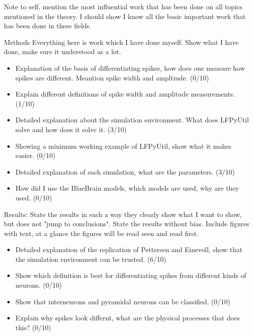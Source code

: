 \documentclass[altfont, fleqn]{uiophd}
\begin{document}
\noindent 
Note to self, mention the most influential work that has been done on all
topics mentioned in the theory. I should show I know all the basic 
important work that has been done in these fields. 
\newline

Methods
\newline
Everything here is work which I have done myself. Show what I have done, make sure
it understood as a lot.
\begin{itemize}
    \item Explanation of the basis of differentiating spikes, how does
        one measure how spikes are different. Meantion spike width and 
        ampltiude. (0/10)
    \item Explain different definitions of spike width and amplitude measurements. (1/10)
    \item Detailed explanation about the simulation environment. 
        What does LFPyUtil solve and how does it solve it. (3/10)
    \item Showing a minimum working example of LFPyUtil, show what it makes easier. (0/10)
    \item Detailed explanation of each simulation, what are the parameters. (3/10)
    \item How did I use the BlueBrain models, which models are used, why are they used. (0/10)
\end{itemize}

Results:
\newline
State the results in such a way they clearly show what I want to show, but
does not "jump to conclusions". State the results without bias.
Include figures with text, at a glance the figures will be read seen and read
first. 
\begin{itemize}
    \item Detailed explanation of the replication of Pettersen and Einevoll, show 
        that the simulation environment can be trusted. (6/10)
    \item Show which definition is best for differentiating spikes from different
        kinds of neurons. (0/10)
    \item Show that interneurons and pyramidal neurons can be classified. (0/10)
    \item Explain why spikes look differnt, what are the physical processes that 
        does this? (0/10)
\end{itemize}
\end{document}
